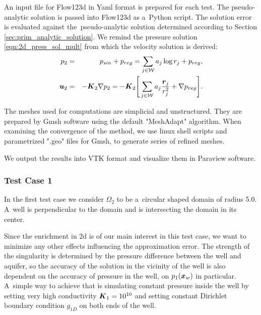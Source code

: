 An input file for Flow123d in Yaml format is prepared for each test.
The pseudo-analytic solution is passed into Flow123d as a~Python script.
The solution error is evaluated against the~pseudo-analytic solution determined according
to Section \ref{sec:prim_analytic_solution}. We remind the pressure solution \eqref{eqn:2d_press_sol_mult} from which the velocity solution is derived:
\begin{eqnarray}
p_2 &=& p_{sin} + p_{reg} = \sum\limits_{j\in\mathcal{W}} a_j\log r_j + p_{reg}, \label{eqn:2d_press_solution}\\
\mathbf{\boldsymbol{u}}_2 &=& -\mathbf{\boldsymbol{K}}_2 \nabla p_2 = - \mathbf{\boldsymbol{K}}_2 \Bigg[ \sum\limits_{j\in\mathcal{W}} a_j\frac{\mathbf{\boldsymbol{r}}_j}{r_j^2} + \nabla p_{reg} \Bigg].  \label{eqn:2d_vel_solution}
\end{eqnarray}

The meshes used for computations are simplicial and unstructured.
They are prepared by Gmsh software using the default "MeshAdapt" algorithm.
When examining the convergence of the method, we use linux shell scripts and parametrized ".geo" files for Gmsh,
to generate series of refined meshes.

We output the results into VTK format and visualize them in Paraview software. 

\subsubsection{Test Case 1}
In the first test case we consider $\Omega_2$ to be a~circular shaped domain of radius 5.0.
A~well is perpendicular to the domain and is intersecting the domain in its center.

Since the enrichment in 2d is of our main interest in this test case, we want to minimize any other effects
influencing the approximation error. The strength of the singularity is determined by the pressure difference
between the well and aquifer, so the accuracy of the solution in the vicinity of the well is also dependent
on the accuracy of pressure in the well, on $p_1(\mathbf{\boldsymbol{x}}_w)$ in particular.
A~simple way to achieve that is simulating constant pressure inside the well by setting very high conductivity $\mathbf{\boldsymbol{K}}_1=10^{10}$
and setting constant Dirichlet boundary condition $g_{1D}$ on both ends of the well.

